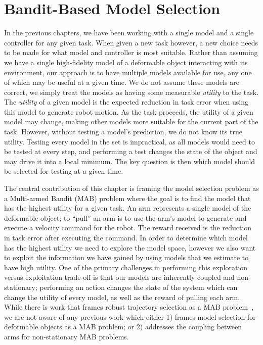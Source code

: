 \chapter{Bandit-Based Model Selection}

In the previous chapters, we have been working with a single model and a single controller for any given task. When given a new task however, a new choice needs to be made for what model and controller is most suitable. Rather than assuming we have a single high-fidelity model of a deformable object interacting with its environment, our approach is to have multiple models available for use, any one of which may be useful at a given time. We do not assume these models are correct, we simply treat the models as having some measurable \textit{utility} to the task. The \textit{utility} of a given model is the expected reduction in task error when using this model to generate robot motion. As the task proceeds, the utility of a given model may change, making other models more suitable for the current part of the task. However, without testing a model's prediction, we do not know its true utility. Testing every model in the set is impractical, as all models would need to be tested at every step, and performing a test changes the state of the object and may drive it into a local minimum. The key question is then which model should be selected for testing at a given time.

The central contribution of this chapter is framing the model selection problem as a Multi-armed Bandit (MAB) problem where the goal is to find the model that has the highest utility for a given task. An arm represents a single model of the deformable object; to ``pull'' an arm is to use the arm's model to generate and execute a velocity command for the robot. The reward received is the reduction in task error after executing the command. In order to determine which model has the highest utility we need to explore the model space, however we also want to exploit the information we have gained by using models that we estimate to have high utility. One of the primary challenges in performing this exploration versus exploitation trade-off is that our models are inherently coupled and non-stationary; performing an action changes the state of the system which can change the utility of every model, as well as the reward of pulling each arm. While there is work that frames robust trajectory selection as a MAB problem~\cite{Koval2015}, we are not aware of any previous work which either 1) frames model selection for deformable objects as a MAB problem; or 2) addresses the coupling between arms for non-stationary MAB problems.

